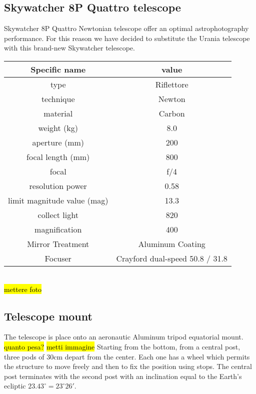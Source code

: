 \documentclass{article}
\begin{document}
\begin{multicols}{2}
        \subsection{Skywatcher 8P Quattro telescope}
        Skywatcher 8P Quattro Newtonian telescope offer an optimal astrophotography performance.
        For this reason we have decided to substitute the Urania telescope with this brand-new Skywatcher telescope.
        \\
        \begin{minipage}{0.5\textwidth}
            \centering
            \begin{tabular}{c|c}
                Specific name & value \\
                \hline
                type & Riflettore \\
                technique & Newton  \\
                material & Carbon  \\
                weight (kg) & 8.0 \\
                aperture (mm) & 200 \\
                focal length (mm) & 800 \\
                focal & f/4 \\
                resolution power & 0.58 \\
                limit magnitude value (mag) & 13.3 \\
                collect light & 820 \\
                magnification & 400 \\
                Mirror Treatment & Aluminum Coating \\
                Focuser & Crayford dual-speed 50.8 / 31.8 
            \end{tabular}
        \end{minipage}
        \\
        \hl{mettere foto}

        \subsection{Telescope mount}
        The telescope is place onto an aeronautic Aluminum tripod equatorial mount.
        \hl{quanto pesa? }
        \hl{ metti immagine}
        Starting from the bottom, from a central post, three pods of 30cm depart from the center. Each one has a wheel which permits the structure to move freely and then to fix the position using stops.
        The central post terminates with the second post with an inclination equal to the Earth's ecliptic \(23.43^{\circ} = 23^{\circ} 26'\).


\end{multicols}
\end{document}
